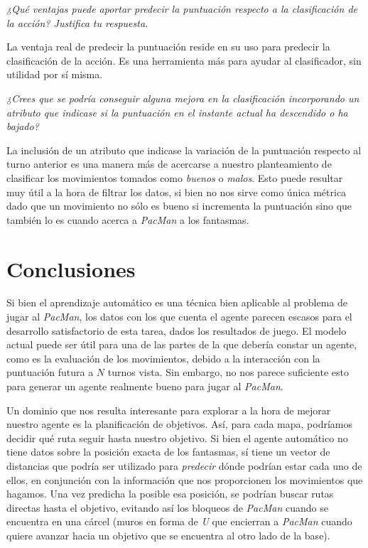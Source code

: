 \documentclass[12pt]{article}
\begin{document}
\begin{center}
     \emph{¿Qué ventajas puede aportar predecir la puntuación respecto a la clasificación de la acción? Justifica tu respuesta.}
\end{center}

La ventaja real de predecir la puntuación reside en su uso para predecir la clasificación de la acción. Es una herramienta más para ayudar al clasificador, sin utilidad por sí misma.

\begin{center}
    \emph{¿Crees que se podría conseguir alguna mejora en la clasificación incorporando un atributo que indicase si la puntuación en el instante actual ha descendido o ha bajado?}
\end{center}

La inclusión de un atributo que indicase la variación de la puntuación respecto al turno anterior es una manera más de acercarse a nuestro planteamiento de clasificar los movimientos tomados como \emph{buenos} o \emph{malos}. Esto puede resultar muy útil a la hora de filtrar los datos, si bien no nos sirve como única métrica dado que un movimiento no sólo es bueno si incrementa la puntuación sino que también lo es cuando acerca a \emph{PacMan} a los fantasmas.

\newpage
\section{Conclusiones}

Si bien el aprendizaje automático es una técnica bien aplicable al problema de jugar al \emph{PacMan}, los datos con los que cuenta el agente parecen escasos para el desarrollo satisfactorio de esta tarea, dados los resultados de juego. El modelo actual puede ser útil para una de las partes de la que debería constar un agente, como es la evaluación de los movimientos, debido a la interacción con la puntuación futura a $N$ turnos vista. Sin embargo, no nos parece suficiente esto para generar un agente realmente bueno para jugar al \emph{PacMan}.

Un dominio que nos resulta interesante para explorar a la hora de mejorar nuestro agente es la planificación de objetivos. Así, para cada mapa, podríamos decidir qué ruta seguir hasta nuestro objetivo. Si bien el agente automático no tiene datos sobre la posición exacta de los fantasmas, sí tiene un vector de distancias que podría ser utilizado para \emph{predecir} dónde podrían estar cada uno de ellos, en conjunción con la información que nos proporcionen los movimientos que hagamos. Una vez predicha la posible esa posición, se podrían buscar rutas directas hasta el objetivo, evitando así los bloqueos de \emph{PacMan} cuando se encuentra en una cárcel (muros en forma de \emph{U} que encierran a \emph{PacMan} cuando quiere avanzar hacia un objetivo que se encuentra al otro lado de la base).
\end{document}
